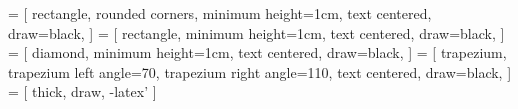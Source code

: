 \usepackage{tikz}
\usetikzlibrary{shapes.geometric, arrows}
\usetikzlibrary{positioning}

 = [
    rectangle,
    rounded corners,
    minimum height=1cm,
    text centered,
    draw=black,
]
 = [
    rectangle,
    minimum height=1cm,
    text centered,
    draw=black,
]
 = [
    diamond,
    minimum height=1cm,
    text centered,
    draw=black,
]
 = [
    trapezium,
    trapezium left angle=70,
    trapezium right angle=110,
    text centered,
    draw=black,
]
 = [
    thick,
    draw,
    -latex'
]
